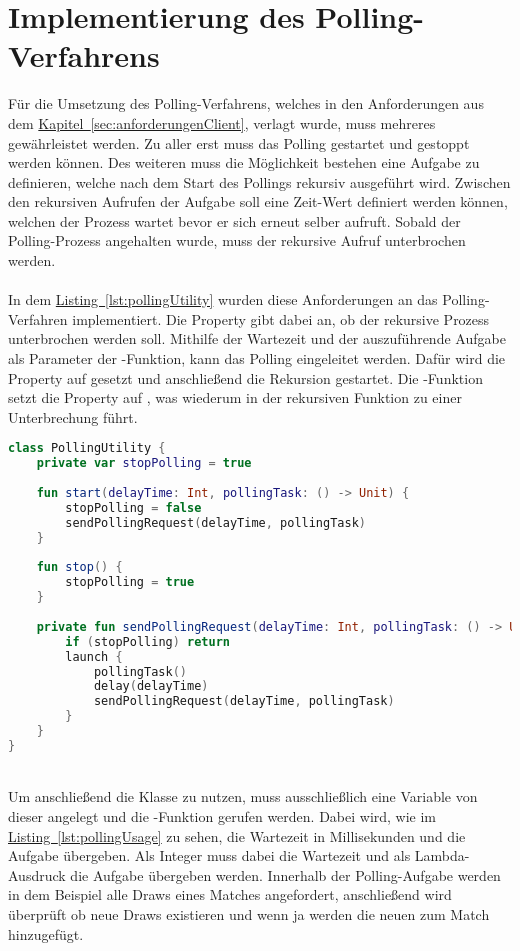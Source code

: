 \section{Implementierung des Polling-Verfahrens}\label{sec:polling}
Für die Umsetzung des Polling-Verfahrens, welches in den Anforderungen aus dem \hyperref[sec:anforderungenClient]{Kapitel~\ref{sec:anforderungenClient}}, verlagt wurde, muss mehreres gewährleistet werden. Zu aller erst muss das Polling gestartet und gestoppt werden können. Des weiteren muss die Möglichkeit bestehen eine Aufgabe zu definieren, welche nach dem Start des Pollings rekursiv ausgeführt wird. Zwischen den rekursiven Aufrufen der Aufgabe soll eine Zeit-Wert definiert werden können, welchen der Prozess wartet bevor er sich erneut selber aufruft. Sobald der Polling-Prozess angehalten wurde, muss der rekursive Aufruf unterbrochen werden.\\
\\
In dem \hyperref[lst:pollingUtility]{Listing~\ref{lst:pollingUtility}} wurden diese Anforderungen an das Polling-Verfahren implementiert. Die Property  gibt dabei an, ob der rekursive Prozess unterbrochen werden soll. Mithilfe der Wartezeit und der auszuführende Aufgabe als Parameter der -Funktion, kann das Polling eingeleitet werden. Dafür wird die Property  auf  gesetzt und anschließend die Rekursion gestartet. Die -Funktion setzt die Property  auf , was wiederum in der rekursiven Funktion  zu einer Unterbrechung führt.\\
\begin{lstlisting}[style=lstStyleFramed, language=Kotlin, caption={Implementierung des Polling-Verfahrens}, label=lst:pollingUtility, float]
class PollingUtility {
	private var stopPolling = true
	
	fun start(delayTime: Int, pollingTask: () -> Unit) {
		stopPolling = false
		sendPollingRequest(delayTime, pollingTask)
	}
	
	fun stop() {
		stopPolling = true
	}
	
	private fun sendPollingRequest(delayTime: Int, pollingTask: () -> Unit) {
		if (stopPolling) return
		launch {
			pollingTask()
			delay(delayTime)
			sendPollingRequest(delayTime, pollingTask)
		}
	}
}
\end{lstlisting}
\\
Um anschließend die Klasse  zu nutzen, muss ausschließlich eine Variable von dieser angelegt und die -Funktion gerufen werden. Dabei wird, wie im \hyperref[lst:pollingUsage]{Listing~\ref{lst:pollingUsage}} zu sehen, die Wartezeit in Millisekunden und die Aufgabe übergeben. Als Integer muss dabei die Wartezeit und als Lambda-Ausdruck die Aufgabe übergeben werden. Innerhalb der Polling-Aufgabe werden in dem Beispiel alle Draws eines Matches angefordert, anschließend wird überprüft ob neue Draws existieren und wenn ja werden die neuen zum Match hinzugefügt.
